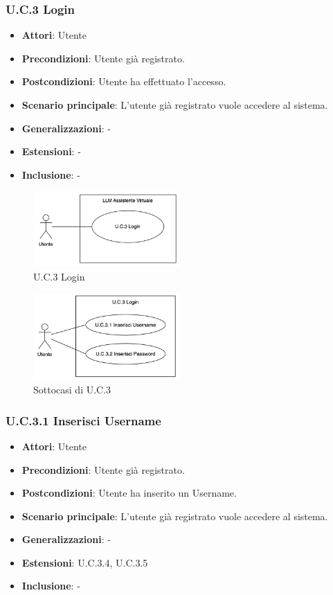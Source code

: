 \subsubsection{U.C.3 Login}
\begin{itemize}
    \item \textbf{Attori}: Utente
    \item \textbf{Precondizioni}: Utente già registrato.
    \item \textbf{Postcondizioni}: Utente ha effettuato l'accesso.
    \item \textbf{Scenario principale}: L'utente già registrato vuole accedere al sistema.
    \item \textbf{Generalizzazioni}: -
    \item \textbf{Estensioni}: -
    \item \textbf{Inclusione}: -
\end{itemize}
\begin{figure}[h!]
    \centering
    \includegraphics[width=0.5\textwidth]{img/UC3.png}
    \caption{U.C.3 Login}
\end{figure}
\begin{figure}[h!]
    \centering
    \includegraphics[width=0.5\textwidth]{img/UC3p1.png}
    \caption{Sottocasi di U.C.3}
\end{figure}
\subsubsection{U.C.3.1 Inserisci Username}
\begin{itemize}
    \item \textbf{Attori}: Utente
    \item \textbf{Precondizioni}: Utente già registrato.
    \item \textbf{Postcondizioni}: Utente ha inserito un Username.
    \item \textbf{Scenario principale}: L'utente già registrato vuole accedere al sistema.
    \item \textbf{Generalizzazioni}: -
    \item \textbf{Estensioni}: U.C.3.4, U.C.3.5
    \item \textbf{Inclusione}: -
\end{itemize}
